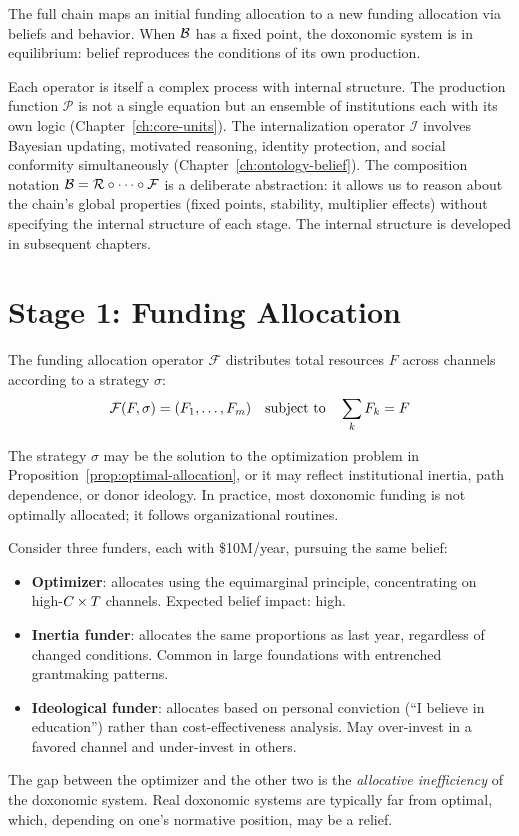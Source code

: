 The full chain maps an initial funding allocation to a new funding allocation via beliefs and behavior.
When $\mathcal{B}$ has a fixed point, the doxonomic system is in equilibrium: belief reproduces the conditions of its own production.

\begin{remark}
Each operator is itself a complex process with internal structure.
The production function $\mathcal{P}$ is not a single equation but an ensemble of institutions each with its own logic (Chapter~\ref{ch:core-units}).
The internalization operator $\mathcal{I}$ involves Bayesian updating, motivated reasoning, identity protection, and social conformity simultaneously (Chapter~\ref{ch:ontology-belief}).
The composition notation $\mathcal{B} = \mathcal{R} \circ \cdots \circ \mathcal{F}$ is a deliberate abstraction: it allows us to reason about the chain's global properties (fixed points, stability, multiplier effects) without specifying the internal structure of each stage.
The internal structure is developed in subsequent chapters.
\end{remark}


\section{Stage 1: Funding Allocation}
\label{sec:ch5-funding}

The funding allocation operator $\mathcal{F}$ distributes total resources $F$ across channels according to a strategy $\sigma$:
\[
  \mathcal{F}(F, \sigma) = (F_{1}, \ldots, F_{m}) \quad \text{subject to} \quad \sum_k F_{k} = F
\]

The strategy $\sigma$ may be the solution to the optimization problem in Proposition~\ref{prop:optimal-allocation}, or it may reflect institutional inertia, path dependence, or donor ideology.
In practice, most doxonomic funding is not optimally allocated; it follows organizational routines.

\begin{example}
\label{ex:funding-strategies}
Consider three funders, each with \$10M/year, pursuing the same belief:
\begin{itemize}[nosep]
  \item \textbf{Optimizer}: allocates using the equimarginal principle, concentrating on high-$C_{} \times T_{}$ channels. Expected belief impact: high.
  \item \textbf{Inertia funder}: allocates the same proportions as last year, regardless of changed conditions. Common in large foundations with entrenched grantmaking patterns.
  \item \textbf{Ideological funder}: allocates based on personal conviction (``I believe in education'') rather than cost-effectiveness analysis. May over-invest in a favored channel and under-invest in others.
\end{itemize}
The gap between the optimizer and the other two is the \emph{allocative inefficiency} of the doxonomic system.
Real doxonomic systems are typically far from optimal, which, depending on one's normative position, may be a relief.
\end{example}

